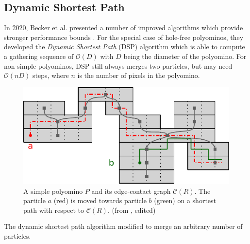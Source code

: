 \subsection{Dynamic Shortest Path}
In 2020, Becker et al. presented a number of improved algorithms which provide stronger performance bounds \cite{becker2020}. For the special case of hole-free polyominos, they developed the \textit{Dynamic Shortest Path} (DSP) algorithm which is able to compute a gathering sequence of $\mathcal{O}(D)$ with $D$ being the diameter of the polyomino. For non-simple polyominos, DSP still always merges two particles, but may need $\mathcal{O}(nD)$ steps, where $n$ is the number of pixels in the polyomino. 

\begin{figure}[ht]
    
    \begin{center}
        \includegraphics[clip, width=0.6\columnwidth]{figures/drugdelivery/Gathering_Simple_b.pdf}
    \end{center}
    
    \caption[DSP and the Edge Contact Graph]{A simple polyomino $P$ and its edge-contact graph $\mathcal{C}(R)$. The particle $a$ (red) is moved towards particle $b$ (green) on a shortest path with respect to $\mathcal{C}(R)$. (from \cite{becker2020}, edited)}
    \label{fig:edge_contact_graph}
\end{figure}


\begin{algorithm}[ht]


    
    \caption[Dynamic Shortest Path Algorithm]{The dynamic shortest path algorithm modified to merge an arbitrary number of particles.}\label{alg:DSP}
\end{algorithm}

